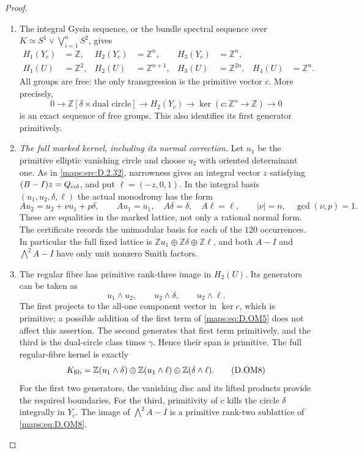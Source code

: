 \begin{proof}
\begin{enumerate}[label=\arabic*.,leftmargin=*]
\item The integral Gysin sequence, or the bundle spectral
sequence over $K\simeq S^1\vee\bigvee_{i=1}^nS^2$, gives
\[
\begin{aligned}
 H_1(Y_c)&=\mathbb Z,&
 H_2(Y_c)&=\mathbb Z^n,&
 H_3(Y_c)&=\mathbb Z^n,\\
 H_1(U)&=\mathbb Z^2,&
 H_2(U)&=\mathbb Z^{n+1},&
 H_3(U)&=\mathbb Z^{2n},&
 H_4(U)&=\mathbb Z^n .
\end{aligned}                                             \tag{D.OM4}\label{maps:eq:D.OM4}
\]
All groups are free: the only transgression is the
primitive vector $c$. More precisely,
\[
 0\longrightarrow\mathbb Z[\delta\times\text{dual circle}]
 \longrightarrow H_2(Y_c)
 \longrightarrow\ker(c:\mathbb Z^n\to\mathbb Z)
 \longrightarrow0                                        \tag{D.OM5}\label{maps:eq:D.OM5}
\]
is an exact sequence of free groups. This also identifies
its first generator primitively.

\item \emph{The full marked kernel, including its normal correction.}
Let $u_1$ be the primitive elliptic vanishing circle and
choose $u_2$ with oriented determinant one. As in \ref{maps:src:D.2.32},
narrowness gives an integral vector $z$ satisfying
$(B-I)z=Q_{\rm col}$, and put $\ell=(-z,0,1)$.
In the integral basis $(u_1,u_2,\delta,\ell)$ the actual
monodromy has the form
\[
 A u_2=u_2+\nu u_1+p\delta,\qquad
 A u_1=u_1,\quad A\delta=\delta,\quad A\ell=\ell,
 \qquad |\nu|=n,\quad\gcd(\nu,p)=1.                        \tag{D.OM6}\label{maps:eq:D.OM6}
\]
These are equalities in the marked lattice, not only
a rational normal form. The certificate records the
unimodular basis for each of the $120$ occurrences.
In particular the full fixed lattice is
$\mathbb Zu_1\oplus\mathbb Z\delta\oplus\mathbb Z\ell$,
and both $A-I$ and $\bigwedge^2 A-I$ have only unit
nonzero Smith factors.

\item The regular fibre has primitive rank-three image in
$H_2(U)$. Its generators can be taken as
\[
 u_1\wedge u_2,\qquad u_2\wedge\delta,\qquad
 u_2\wedge\ell.                                           \tag{D.OM7}\label{maps:eq:D.OM7}
\]
The first projects to the all-one component vector in
$\ker c$, which is primitive; a possible addition of
the first term of \eqref{maps:eq:D.OM5} does not affect this assertion.
The second generates that first term primitively, and
the third is the dual-circle class times $\gamma$.
Hence their span is primitive. The full regular-fibre
kernel is exactly
\[
 K_{\rm fib}=
 \mathbb Z(u_1\wedge\delta)\oplus
 \mathbb Z(u_1\wedge\ell)\oplus
 \mathbb Z(\delta\wedge\ell).                              \tag{D.OM8}\label{maps:eq:D.OM8}
\]
For the first two generators, the vanishing disc and
its lifted products provide the required boundaries.
For the third, primitivity of $c$ kills the circle
$\delta$ integrally in $Y_c$. The image of
$\bigwedge^2 A-I$ is a primitive rank-two sublattice
of \eqref{maps:eq:D.OM8}.


\end{enumerate}
\end{proof}

